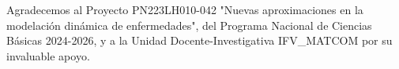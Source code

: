 \begin{acknowledgements}
    Agradecemos al Proyecto PN223LH010-042 "Nuevas aproximaciones en la modelación dinámica de enfermedades", del Programa Nacional de Ciencias Básicas 2024-2026, y a la Unidad Docente-Investigativa IFV\_MATCOM por su invaluable apoyo.
\end{acknowledgements}